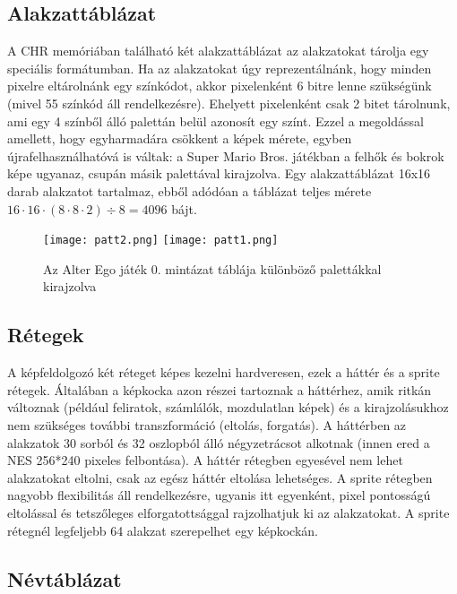 \subsection{Alakzattáblázat}

A CHR memóriában található két alakzattáblázat az alakzatokat tárolja egy speciális formátumban. Ha az alakzatokat úgy reprezentálnánk, hogy minden pixelre eltárolnánk egy színkódot, akkor pixelenként 6 bitre lenne szükségünk (mivel 55 színkód áll rendelkezésre). Ehelyett pixelenként csak 2 bitet tárolnunk, ami egy 4 színből álló palettán belül azonosít egy színt. Ezzel a megoldással amellett, hogy egyharmadára csökkent a képek mérete, egyben újrafelhasználhatóvá is váltak: a Super Mario Bros. játékban a felhők és bokrok képe ugyanaz, csupán másik palettával kirajzolva.
Egy alakzattáblázat 16x16 darab alakzatot tartalmaz, ebből adódóan a táblázat teljes mérete $16\cdot16\cdot(8\cdot8\cdot2)\div8 = 4096$ bájt.

\begin{figure}[H]
	\centering
	\texttt{[image: patt2.png]}
	\hspace{5pt}
	\texttt{[image: patt1.png]}
	\caption{Az Alter Ego játék 0. mintázat táblája különböző palettákkal kirajzolva}
\end{figure}

\subsection{Rétegek}
A képfeldolgozó két réteget képes kezelni hardveresen, ezek a háttér és a sprite rétegek.
Általában a képkocka azon részei tartoznak a háttérhez, amik ritkán változnak (például feliratok, számlálók, mozdulatlan képek) és a kirajzolásukhoz nem szükséges további transzformáció (eltolás, forgatás). A háttérben az alakzatok 30 sorból és 32 oszlopból álló négyzetrácsot alkotnak (innen ered a NES 256*240 pixeles felbontása).
A háttér rétegben egyesével nem lehet alakzatokat eltolni, csak az egész háttér eltolása lehetséges. A sprite rétegben nagyobb flexibilitás áll rendelkezésre, ugyanis itt egyenként, pixel pontosságú eltolással és tetszőleges elforgatottsággal rajzolhatjuk ki az alakzatokat. A sprite rétegnél legfeljebb 64 alakzat szerepelhet egy képkockán.  

\subsection{Névtáblázat}


